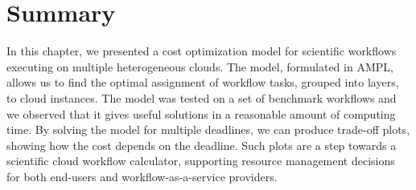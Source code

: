 {\section{Summary}

    In this chapter, we presented a cost optimization model for scientific workflows executing on multiple heterogeneous clouds. The model, formulated in AMPL, allows us to find the optimal assignment of workflow tasks, grouped into layers, to cloud instances. The model was tested on a set of benchmark workflows and we observed that it gives useful solutions in a reasonable amount of computing time.  By solving the model for multiple deadlines, we can produce trade-off plots, showing how the cost depends on the deadline. Such plots are a step towards a scientific cloud workflow calculator, supporting resource management decisions for both end-users and workflow-as-a-service providers.
  
} %